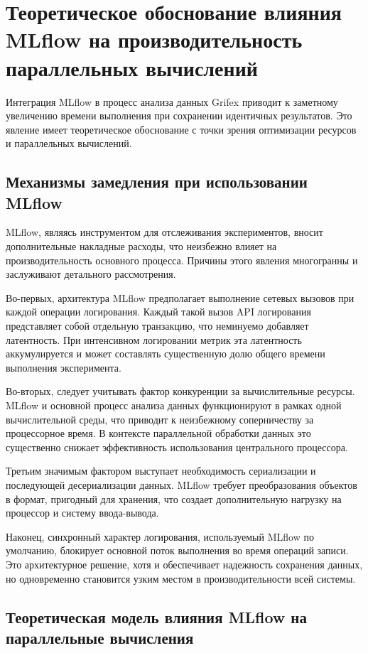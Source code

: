 \section{Теоретическое обоснование влияния MLflow на производительность параллельных вычислений}

Интеграция MLflow в процесс анализа данных Grifex приводит к заметному
увеличению времени выполнения при сохранении идентичных результатов. Это явление
имеет теоретическое обоснование с точки зрения оптимизации ресурсов и
параллельных вычислений.

\subsection{Механизмы замедления при использовании MLflow}

MLflow, являясь инструментом для отслеживания экспериментов, вносит
дополнительные накладные расходы, что неизбежно влияет на производительность
основного процесса. Причины этого явления многогранны и заслуживают детального
рассмотрения.

Во-первых, архитектура MLflow предполагает выполнение сетевых вызовов при каждой
операции логирования. Каждый такой вызов API логирования представляет собой
отдельную транзакцию, что неминуемо добавляет латентность. При интенсивном
логировании метрик эта латентность аккумулируется и может составлять
существенную долю общего времени выполнения эксперимента.

Во-вторых, следует учитывать фактор конкуренции за вычислительные ресурсы.
MLflow и основной процесс анализа данных функционируют в рамках одной
вычислительной среды, что приводит к неизбежному соперничеству за процессорное
время. В контексте параллельной обработки данных это существенно снижает
эффективность использования центрального процессора.

Третьим значимым фактором выступает необходимость сериализации и последующей
десериализации данных. MLflow требует преобразования объектов в формат,
пригодный для хранения, что создает дополнительную нагрузку на процессор и
систему ввода-вывода.

Наконец, синхронный характер логирования, используемый MLflow по умолчанию,
блокирует основной поток выполнения во время операций записи. Это архитектурное
решение, хотя и обеспечивает надежность сохранения данных, но одновременно
становится узким местом в производительности всей системы.

\subsection{Теоретическая модель влияния MLflow на параллельные вычисления}

